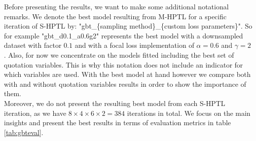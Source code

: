 \documentclass[12pt,titlepage]{article}
\begin{document}
Before presenting the results, we want to make some additional notational remarks. We denote the best model resulting from M-HPTL for a specific iteration of S-HPTL by: "gbt\_\{sampling method\}\_\{custom loss parameters\}". So for example "gbt\_d0.1\_a0.6g2" represents the best model with a downsampled dataset with factor $0.1$ and with a focal loss implementation of $\alpha=0.6$ and $\gamma=2$. Also, for now we concentrate on the models fitted including the best set of quotation variables. This is why this notation does not include an indicator for which variables are used. With the best model at hand however we compare both with and without quotation variables results in order to show the importance of them. \\
Moreover, we do not present the resulting best model from each S-HPTL iteration, as we have $8\times4\times6\times2=384$ iterations in total. We focus on the main insights and present the best results in terms of evaluation metrics in table \ref{tab:gbteval}. \\
\setlength{\tabcolsep}{3pt}
\renewcommand{\arraystretch}{1.5}
\end{document}
